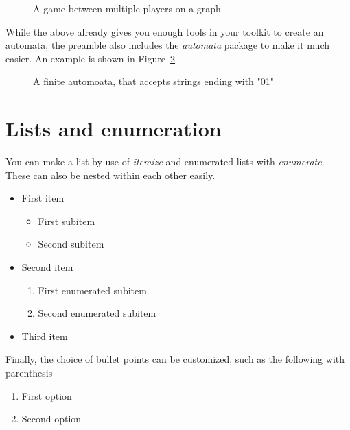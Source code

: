 \documentclass[a4, english]{article}
\begin{document}
\begin{figure}[ht!]
  \centering
  
  \caption{A game between multiple players on a graph}
  \label{fig:game}
\end{figure}

While the above already gives you enough tools in your toolkit to create an
automata, the preamble also includes the \emph{automata} package to make it much
easier. An example is shown in Figure~\ref{fig:FA}
\begin{figure}[ht!]
  \centering
  \caption{A finite automoata, that accepts strings ending with "01"}
  \label{fig:FA}
\end{figure}


\section{Lists and enumeration}
You can make a list by use of \emph{itemize} and enumerated lists with
\emph{enumerate}. These can also be nested within each other easily.
\begin{itemize}
\item First item
  \begin{itemize}
  \item First subitem
  \item Second subitem
  \end{itemize}
\item Second item
  \begin{enumerate}
  \item First enumerated subitem
  \item Second enumerated subitem
  \end{enumerate}
\item Third item
\end{itemize}
Finally, the choice of bullet points can be customized, such as the following
with parenthesis
\begin{enumerate}[label=(\alph*)]
\item First option
\item Second option
\end{enumerate}
\end{document}
